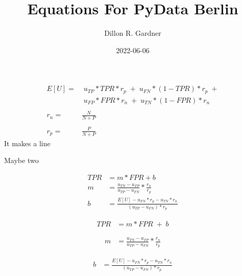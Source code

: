 \documentclass[11pt]{amsart}
\title{Equations For PyData Berlin}
\author{Dillon R. Gardner}
\date{2022-06-06}                                           %
\begin{document}
\maketitle

 \begin{align*}
E[ U ] = & \;  u_{TP} * TPR * r_p \; + \; u_{FN} * (1 - TPR) * r_p  \;+ \\
	    & \; u_{FP} * FPR * r_n \; +  \;u_{TN} * (1 - FPR) * r_n \\
	    \\
r_n = & \frac{N}{N + P} \\
\\
r_p =  &\frac{P}{N+P}
\end{align*}
It makes a line

Maybe two

 \begin{align*}
 TPR &= m * FPR + b
 \\
 m &= \frac{u_{TN} - u_{FP}}{u_{TP} - u_{FN}} * \frac{r_n}{r_p}
 \\
b &= \frac{E[U] - u_{FN} * r_p - u_{TN} * r_n}{(u_{TP} - u_{FN})*r_p}  
 \end{align*}
 
  \begin{align*}
 TPR &= m * FPR \;+\; b
 \end{align*}
 
 
 \begin{align*}
m &= \frac{u_{TN} - u_{FP}}{u_{TP} - u_{FN}} * \frac{r_n}{r_p}
\end{align*}

 \begin{align*}
b &= \frac{E[U] - u_{FN} * r_p - u_{TN} * r_n}{(u_{TP} - u_{FN})*r_p} 
\end{align*}


\end{document}
